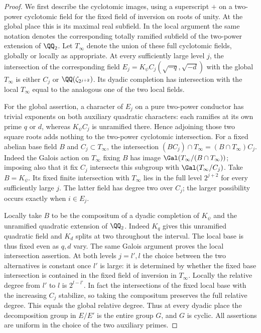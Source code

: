 \documentclass[a4paper,11pt]{article}
\theoremstyle{definition}
\theoremstyle{remark}
\numberwithin{equation}{section}
\begin{document}
\begin{proof}
We first describe the cyclotomic images, using a superscript \(+\) on
a two-power cyclotomic field for the fixed field of inversion on roots
of unity. At the global place this is its maximal real subfield.
In the local argument the same notation denotes the corresponding
totally ramified subfield of the two-power extension of \(\QQ_2\).
Let \(T_\infty\) denote the union of these full cyclotomic fields,
globally or locally as appropriate. At every sufficiently large
level \(j\), the intersection of the corresponding field
\(E_j=K_\psi C_j(\sqrt{-q},\sqrt{-d})\) with the global \(T_\infty\)
is either \(C_j\) or \(\QQ(\zeta_{2^{j+2}})\). Its dyadic completion
has intersection with the local \(T_\infty\) equal to the analogous
one of the two local fields.

For the global assertion, a character of \(E_j\) on a pure two-power
conductor has trivial exponents on both auxiliary quadratic characters:
each ramifies at its own prime \(q\) or \(d\), whereas \(K_\psi C_j\)
is unramified there. Hence adjoining those two square roots adds
nothing to the two-power cyclotomic intersection. For a fixed abelian
base field \(B\) and \(C_j\subset T_\infty\), the intersection
\((BC_j)\cap T_\infty=(B\cap T_\infty)C_j\). Indeed the Galois
action on \(T_\infty\) fixing \(B\) has image
\(\Gal(T_\infty/(B\cap T_\infty))\); imposing also that it fix
\(C_j\) intersects this subgroup with \(\Gal(T_\infty/C_j)\).
Take \(B=K_\psi\). Its fixed finite intersection with \(T_\infty\)
lies in the full level \(2^{j+2}\) for every sufficiently large \(j\).
The latter field has degree two over \(C_j\); the larger possibility
occurs exactly when \(i\in E_j\).

Locally take \(B\) to be the compositum of a dyadic completion of
\(K_\psi\) and the unramified quadratic extension of \(\QQ_2\).
Indeed \(K_q\) gives this unramified quadratic field and \(K_d\)
splits at two throughout the interval. The local base is thus fixed
even as \(q,d\) vary. The same Galois argument proves the local
intersection assertion. At both levels \(j=l',l\) the choice between
the two alternatives is constant once \(l'\) is large: it is determined
by whether the fixed base intersection is contained in the fixed
field of inversion in \(T_\infty\). Locally the relative degree
from \(l'\) to \(l\) is \(2^{l-l'}\). In fact the intersections of
the fixed local base with the increasing \(C_j\) stabilize, so taking
the compositum preserves the full relative degree. This equals the
global relative degree. Thus at every dyadic place the decomposition
group in \(E/E'\) is the entire group \(G\), and \(G\) is cyclic.
All assertions are uniform in the choice of the two auxiliary primes.


\end{proof}
\end{document}
